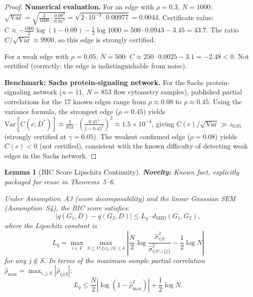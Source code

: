 \documentclass{article}
\theoremstyle{definition}
\theoremstyle{plain}
\newtheorem{lemma}{Lemma}
\theoremstyle{remark}
\DeclareMathOperator{\Var}{Var}
\DeclareMathOperator{\SHD}{SHD}
\begin{document}
\begin{proof}
\textbf{Numerical evaluation.}
For an edge with $\rho = 0.3$, $N = 1000$:
$\sqrt{\Var} = \sqrt{\frac{2}{1000} \cdot \frac{0.09^2}{0.91^2}}
= \sqrt{2 \cdot 10^{-3} \cdot 0.00977} = 0.0044$.
Certificate value:
$C \approx -\frac{1000}{2}\log(1 - 0.09) - \frac{1}{2}\log 1000
= 500 \cdot 0.0943 - 3.45 = 43.7$. The ratio $C/\sqrt{\Var} \approx 9900$,
so this edge is strongly certified.

For a weak edge with $\rho = 0.05$, $N = 500$:
$C \approx 250 \cdot 0.0025 - 3.1 = -2.48 < 0$. Not certified (correctly:
the edge is indistinguishable from noise).

\textbf{Benchmark: Sachs protein-signaling network.}
For the Sachs protein-signaling network ($n=11$, $N=853$ flow cytometry samples), published partial correlations for the 17 known edges range from $\rho \approx 0.08$ to $\rho \approx 0.45$. Using the variance formula, the strongest edge ($\rho = 0.45$) yields $\text{Var}[C(e; D^*)] \approx \frac{2}{853} \cdot \left(\frac{0.45^2}{1-0.45^2}\right)^2 \approx 1.5 \times 10^{-4}$, giving $C(e)/\sqrt{\text{Var}} \gg z_{0.95}$ (strongly certified at $\gamma=0.05$). The weakest confirmed edge ($\rho = 0.08$) yields $C(e) < 0$ (not certified), consistent with the known difficulty of detecting weak edges in the Sachs network.
\end{proof}

\begin{lemma}[BIC Score Lipschitz Continuity]
\label{lem:bic_lipschitz}
\textbf{Novelty:} Known fact, explicitly packaged for reuse in Theorems~5--6.

Under Assumption~A3 (score decomposability) and the linear Gaussian SEM
(Assumption~S4), the BIC score satisfies:
\begin{equation}
|q(G_1, D) - q(G_2, D)| \leq L_q \cdot d_{\SHD}(G_1, G_2),
\end{equation}
where the Lipschitz constant is
\begin{equation}
L_q = \max_{i \in V} \max_{S \subseteq V \setminus \{i\}, |S| \leq k}
\left|\frac{N}{2}\log\frac{\hat{\sigma}^2_{i|S}}{\hat{\sigma}^2_{i|S \cup \{j\}}}
- \frac{1}{2}\log N\right|
\end{equation}
for any $j \notin S$. In terms of the maximum sample partial correlation
$\hat{\rho}_{\max} = \max_{i,j,S} |\hat{\rho}_{ij|S}|$:
\begin{equation}
L_q \leq \frac{N}{2}\left|\log(1 - \hat{\rho}_{\max}^2)\right|
+ \frac{1}{2}\log N.
\end{equation}
\end{lemma}
\end{document}
